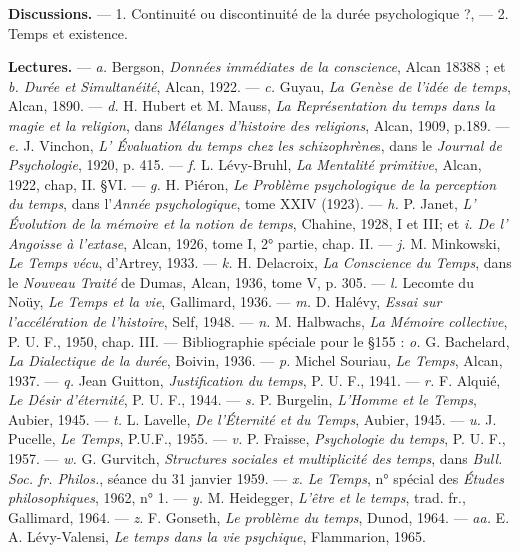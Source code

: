{\bf Discussions.} — 1. {\it }Continuité ou discontinuité de la durée psychologique ?,
— 2. {\it }Temps et existence.

{\bf Lectures.} — {\it a.} Bergson, {\it Données immédiates de la conscience}, Alcan
18388 ; et {\it b. Durée et Simultanéité}, Alcan, 1922. — {\it c.} Guyau, {\it La Genèse de
l’idée de temps}, Alcan, 1890. — {\it d.} H. Hubert et M. Mauss, {\it La Représentation
du temps dans la magie et la religion}, dans {\it Mélanges d'histoire des religions},
Alcan, 1909, p.189. — {\it e.} J. Vinchon, {\it L’ Évaluation du temps chez les schizophrène}s,
dans le {\it Journal de Psychologie}, 1920, p. 415. — {\it f.} L. Lévy-Bruhl,
{\it La Mentalité primitive}, Alcan, 1922, chap, II. \S VI. — {\it g.} H. Piéron, {\it Le
Problème psychologique de la perception du temps}, dans l’{\it Année psychologique},
tome XXIV (1923). — {\it h.} P. Janet, {\it L' Évolution de la mémoire et la
notion de temps}, Chahine, 1928, I et III; et {\it i. De l’ Angoisse à l'extase},
Alcan, 1926, tome I, 2° partie, chap. II. — {\it j.} M. Minkowski, {\it Le Temps vécu},
d’Artrey, 1933. — {\it k.} H. Delacroix, {\it La Conscience du Temps}, dans le {\it Nouveau
Traité} de Dumas, Alcan, 1936, tome V, p. 305. — {\it l.} Lecomte du
Noüy, {\it Le Temps et la vie}, Gallimard, 1936. — {\it m.} D. Halévy, {\it Essai sur
l'accélération de l'histoire}, Self, 1948. — {\it n.} M. Halbwachs, {\it La Mémoire
collective}, P. U. F., 1950, chap. III. — Bibliographie spéciale pour le \S 155 :
{\it o.} G. Bachelard, {\it La Dialectique de la durée}, Boivin, 1936. — {\it p.} Michel
Souriau, {\it Le Temps}, Alcan, 1937. — {\it q.} Jean Guitton, {\it Justification du
temps}, P. U. F., 1941. — {\it r.} F. Alquié, {\it Le Désir d'éternité}, P. U. F., 1944.
— {\it s.} P. Burgelin, {\it L'Homme et le Temps}, Aubier, 1945. — {\it t.} L. Lavelle,
{\it De l'Éternité et du Temps}, Aubier, 1945. — {\it u.} J. Pucelle, {\it Le Temps},
P.U.F., 1955. — {\it v.} P. Fraisse, {\it Psychologie du temps}, P. U. F., 1957.
— {\it w.} G. Gurvitch, {\it Structures sociales et multiplicité des temps}, dans {\it Bull.
Soc. fr. Philos.}, séance du 31 janvier 1959. — {\it x. Le Temps}, n° spécial des
{\it Études philosophiques}, 1962, n° 1. — {\it y.} M. Heidegger, {\it L'être et le temps},
trad. fr., Gallimard, 1964. — {\it z.} F. Gonseth, {\it Le problème du temps}, Dunod,
1964. — {\it aa.} E. A. Lévy-Valensi, {\it Le temps dans la vie psychique},
Flammarion, 1965.

